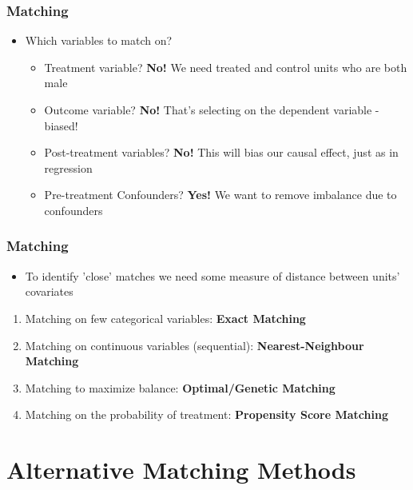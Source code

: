 \documentclass[xcolor=x11names,compress]{beamer}\usepackage[]{graphicx}\usepackage[]{color}
\renewcommand{\(}{\begin{columns}}
\renewcommand{\)}{\end{columns}}
\newcommand{\<}[1]{\begin{column}{#1}}
\renewcommand{\>}{\end{column}}
\begin{document}
\begin{frame}
\frametitle{Matching}
\begin{itemize}
\item Which variables to match on?
\pause
\begin{itemize}
\item Treatment variable? \pause \textbf{No!} We need treated and control units who are both male
\pause
\item Outcome variable? \pause \textbf{No!} That's selecting on the dependent variable - biased!
\pause
\item Post-treatment variables? \pause \textbf{No!} This will bias our causal effect, just as in regression
\pause
\item Pre-treatment Confounders? \pause \textbf{Yes!} We want to remove imbalance due to confounders 
\end{itemize}
\end{itemize}
\end{frame}



\begin{frame}
\frametitle{Matching}
\begin{itemize}
\item To identify 'close' matches we need some measure of distance between units' covariates
\pause
\end{itemize}
\begin{enumerate}
\item Matching on few categorical variables: \textbf{Exact Matching}
\pause
\item Matching on continuous variables (sequential): \textbf{Nearest-Neighbour Matching}
\pause
\item Matching to maximize balance: \textbf{Optimal/Genetic Matching}
\pause
\item Matching on the probability of treatment: \textbf{Propensity Score Matching}
\end{enumerate}
\end{frame}

\section{Alternative Matching Methods}
\end{document}
